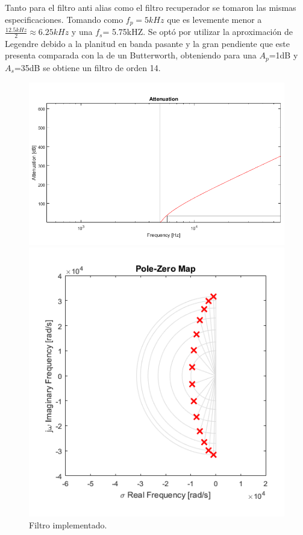 Tanto para el filtro anti alias como el filtro recuperador se tomaron las mismas especificaciones.
Tomando como $f_p= 5kHz$ que es levemente menor a $\frac{12.5kHz}{2}\approx 6.25kHz $ y una $f_s$= 5.75kHZ.
Se optó por utilizar la aproximación de Legendre debido a la planitud en banda pasante y la gran pendiente que este presenta comparada con la de un Butterworth, obteniendo para una $A_p$=1dB y $A_s$=35dB se obtiene un filtro de orden 14.
\begin{figure}[H]
\centering
\includegraphics[width=0.7\linewidth, page=1]{ImagenesEjercicio1/magnitude.png}

\includegraphics[width=0.5\linewidth, page=1]{ImagenesEjercicio1/pz.png}
\caption{Filtro implementado.}
\label{filtros}
\end{figure}

